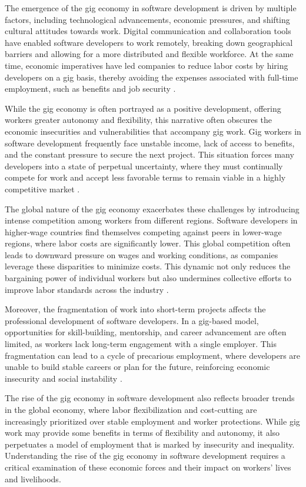 \begin{refsection}
The emergence of the gig economy in software development is driven by multiple factors, including technological advancements, economic pressures, and shifting cultural attitudes towards work. Digital communication and collaboration tools have enabled software developers to work remotely, breaking down geographical barriers and allowing for a more distributed and flexible workforce. At the same time, economic imperatives have led companies to reduce labor costs by hiring developers on a gig basis, thereby avoiding the expenses associated with full-time employment, such as benefits and job security \cite[pp.~56-59]{fuchs2014digital}.

While the gig economy is often portrayed as a positive development, offering workers greater autonomy and flexibility, this narrative often obscures the economic insecurities and vulnerabilities that accompany gig work. Gig workers in software development frequently face unstable income, lack of access to benefits, and the constant pressure to secure the next project. This situation forces many developers into a state of perpetual uncertainty, where they must continually compete for work and accept less favorable terms to remain viable in a highly competitive market \cite[pp.~67-70]{de2019gig}.

The global nature of the gig economy exacerbates these challenges by introducing intense competition among workers from different regions. Software developers in higher-wage countries find themselves competing against peers in lower-wage regions, where labor costs are significantly lower. This global competition often leads to downward pressure on wages and working conditions, as companies leverage these disparities to minimize costs. This dynamic not only reduces the bargaining power of individual workers but also undermines collective efforts to improve labor standards across the industry \cite[pp.~18-21]{scholz2017uberworked}.

Moreover, the fragmentation of work into short-term projects affects the professional development of software developers. In a gig-based model, opportunities for skill-building, mentorship, and career advancement are often limited, as workers lack long-term engagement with a single employer. This fragmentation can lead to a cycle of precarious employment, where developers are unable to build stable careers or plan for the future, reinforcing economic insecurity and social instability \cite[pp.~85-87]{kalleberg2009precarious}.

The rise of the gig economy in software development also reflects broader trends in the global economy, where labor flexibilization and cost-cutting are increasingly prioritized over stable employment and worker protections. While gig work may provide some benefits in terms of flexibility and autonomy, it also perpetuates a model of employment that is marked by insecurity and inequality. Understanding the rise of the gig economy in software development requires a critical examination of these economic forces and their impact on workers' lives and livelihoods.


\end{refsection}
